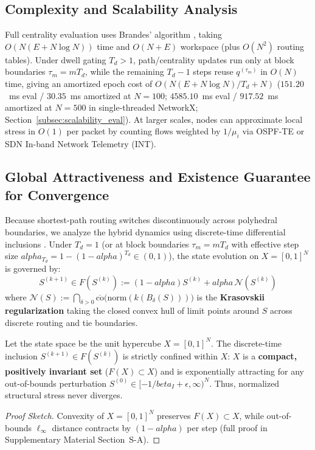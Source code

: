 \documentclass{ccjnl}
\newcommand{\rev}[1]{{\color{blue}#1}}
\def\rev#1{#1}%
\def\kappa{k}%
\def\alpha{alpha}%
\def\beta{beta}%
\begin{document}
\subsection*{Complexity and Scalability Analysis}

Full centrality evaluation uses Brandes' algorithm \cite{Brandes2001Faster}, taking $O(N(E + N \log N))$ time and $O(N+E)$ workspace \rev{(plus $O(N^2)$ routing tables). Under dwell gating $T_d > 1$, path/centrality updates run only at block boundaries $\tau_m = m T_d$, while the remaining $T_d - 1$ steps reuse $q^{(\tau_m)}$ in $O(N)$ time, giving an amortized epoch cost of $O(N(E + N \log N)/T_d + N)$ ($151.20$~ms eval / $30.35$~ms amortized at $N=100$; $4585.10$~ms eval / $917.52$~ms amortized at $N=500$ in single-threaded NetworkX; Section~\ref{subsec:scalability_eval}).} At larger scales, nodes can approximate local stress in $O(1)$ per packet by counting flows weighted by $1/\mu_i$ \cite{Maccari2020DistributedLoad} via OSPF-TE or SDN In-band Network Telemetry (INT).

\subsection{Global Attractiveness and Existence Guarantee for Convergence}
\label{sec:convergence_analysis}
\label{subsec:attractivity}

Because shortest-path routing switches discontinuously across polyhedral boundaries, we analyze the hybrid dynamics using discrete-time differential inclusions \cite{Aubin1984Differential}. Under $T_d=1$ (or at block boundaries $\tau_m = m T_d$ with effective step size $\alpha_{T_d} = 1 - (1-\alpha)^{T_d} \in (0,1)$), the state evolution on $X = [0,1]^N$ is governed by:
\begin{equation}\label{eq:inclusion_map}
S^{(k+1)} \in F(S^{(k)}) := (1-\alpha)S^{(k)}+\alpha\,\mathcal{N}(S^{(k)})
\end{equation}
where $\mathcal{N}(S) := \bigcap_{\delta > 0} \overline{\mathrm{co}}\big(\mathrm{norm}(\kappa(B_\delta(S)))\big)$ is the \textbf{Krasovskii regularization} taking the closed convex hull of limit points around $S$ across discrete routing and tie boundaries.

\begin{lemma}
\label{lemma:invariance}
Let the state space be the unit hypercube $X=[0,1]^N$. 
The discrete-time inclusion $S^{(k+1)}\in F(S^{(k)})$ is strictly confined within $X$: $X$ is a \textbf{compact, positively invariant set} ($F(X) \subset X$) and is \rev{exponentially attracting for any out-of-bounds perturbation $S^{(0)} \in [-1/\beta_I + \epsilon, \infty)^N$}. Thus, normalized structural stress never diverges.
\end{lemma}
\begin{proof}[Proof Sketch]
Convexity of $X=[0,1]^N$ preserves $F(X)\subset X$, while out-of-bounds $\ell_\infty$ distance contracts by $(1-\alpha)$ per step (full proof in Supplementary Material Section~S-A).
\end{proof}
\end{document}
